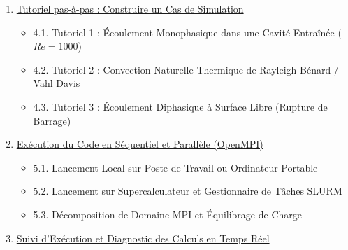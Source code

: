 \documentclass[
  french,
]{article}
\providecommand{\tightlist}{%
  \setlength{\itemsep}{0pt}\setlength{\parskip}{0pt}}
\begin{document}
\begin{enumerate}
\begin{itemize}
    \begin{itemize}
    \tightlist
    \item
      3.2.1. Module \texttt{mesh} (Maillage et Dimensions Géométriques)
    \item
      3.2.2. Module \texttt{physics} (Propriétés Physiques et Modèles
      d'Écoulement)
    \item
      3.2.3. Module \texttt{thermal} (Couplage Énergétique et
      Boussinesq)
    \item
      3.2.4. Module \texttt{time} (Intégration Temporelle et Contrôle
      CFL)
    \item
      3.2.5. Module \texttt{boundary\_conditions} (Conditions aux
      Limites Fluides et Thermiques)
    \item
      3.2.6. Module \texttt{immersed\_boundary} (Frontières Immergées et
      Pénalisation Brinkman)
    \item
      3.2.7. Module \texttt{initial\_condition} (Champs Initiaux et
      Géométries d'Interface)
    \item
      3.2.8. Module \texttt{solver} (Méthode Numérique, Solveur Krylov
      et Préconditionneur)
    \item
      3.2.9. Module \texttt{output} (Sorties Graphiques VTK et
      Diagnostics CSV)
    \end{itemize}
  \end{itemize}
\item
  \hyperref[4-tutoriel-pas-uxe0-pas--construire-un-cas-de-simulation]{Tutoriel
  pas-à-pas : Construire un Cas de Simulation}

  \begin{itemize}
  \tightlist
  \item
    4.1. Tutoriel 1 : Écoulement Monophasique dans une Cavité Entraînée
    (\(Re=1000\))
  \item
    4.2. Tutoriel 2 : Convection Naturelle Thermique de Rayleigh-Bénard
    / Vahl Davis
  \item
    4.3. Tutoriel 3 : Écoulement Diphasique à Surface Libre (Rupture de
    Barrage)
  \end{itemize}
\item
  \hyperref[5-exuxe9cution-du-code-en-suxe9quentiel-et-paralluxe8le-openmpi]{Exécution
  du Code en Séquentiel et Parallèle (OpenMPI)}

  \begin{itemize}
  \tightlist
  \item
    5.1. Lancement Local sur Poste de Travail ou Ordinateur Portable
  \item
    5.2. Lancement sur Supercalculateur et Gestionnaire de Tâches SLURM
  \item
    5.3. Décomposition de Domaine MPI et Équilibrage de Charge
  \end{itemize}
\item
  \hyperref[6-suivi-dexuxe9cution-et-diagnostic-des-calculs-en-temps-ruxe9el]{Suivi
  d'Exécution et Diagnostic des Calculs en Temps Réel}


\end{enumerate}
\end{document}
